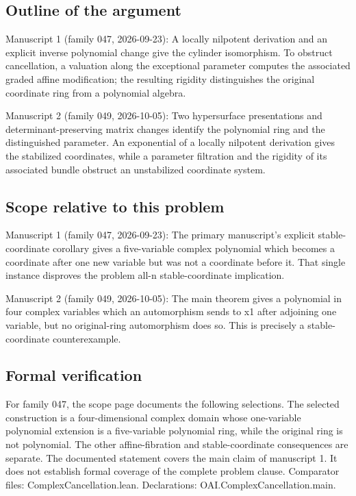 \documentclass[11pt]{article}
\begin{document}
\subsection{Outline of the argument}
Manuscript 1 (family 047, 2026-09-23): A locally nilpotent derivation and an explicit inverse polynomial change give the cylinder isomorphism. To obstruct cancellation, a valuation along the exceptional parameter computes the associated graded affine modification; the resulting rigidity distinguishes the original coordinate ring from a polynomial algebra.

Manuscript 2 (family 049, 2026-10-05): Two hypersurface presentations and determinant-preserving matrix changes identify the polynomial ring and the distinguished parameter. An exponential of a locally nilpotent derivation gives the stabilized coordinates, while a parameter filtration and the rigidity of its associated bundle obstruct an unstabilized coordinate system.

\subsection{Scope relative to this problem}
Manuscript 1 (family 047, 2026-09-23): The primary manuscript's explicit stable-coordinate corollary gives a five-variable complex polynomial which becomes a coordinate after one new variable but was not a coordinate before it. That single instance disproves the problem all-n stable-coordinate implication.

Manuscript 2 (family 049, 2026-10-05): The main theorem gives a polynomial in four complex variables which an automorphism sends to x1 after adjoining one variable, but no original-ring automorphism does so. This is precisely a stable-coordinate counterexample.

\subsection{Formal verification}
For family 047, the scope page documents the following selections. The selected construction is a four-dimensional complex domain whose one-variable polynomial extension is a five-variable polynomial ring, while the original ring is not polynomial. The other affine-fibration and stable-coordinate consequences are separate. The documented statement covers the main claim of manuscript 1. It does not establish formal coverage of the complete problem clause. Comparator files: ComplexCancellation.lean. Declarations: OAI.ComplexCancellation.main.
\end{document}
